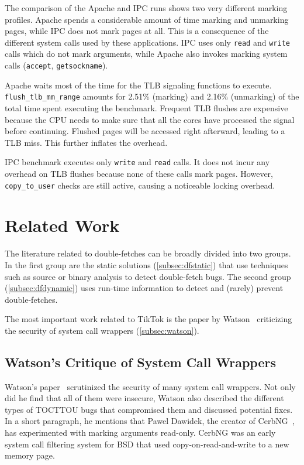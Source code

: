 \documentclass[conference]{IEEEtran}
\newcommand{\sysname}{TikTok}
\begin{document}
The comparison of the Apache and IPC runs shows two very different marking
profiles. Apache spends a considerable amount of time marking and unmarking
pages, while IPC does not mark pages at all. This is a consequence of the
different system calls used by these applications. IPC uses only \texttt{read}
and \texttt{write} calls which do not mark arguments, while Apache also invokes
marking system calls (\texttt{accept}, \texttt{getsockname}).

Apache waits most of the time for the TLB signaling functions to execute.
\texttt{flush\_tlb\_mm\_range} amounts for 2.51\% (marking) and 2.16\%
(unmarking) of the total time spent executing the benchmark. Frequent TLB
flushes are expensive because the CPU needs to make sure that all the cores have
processed the signal before continuing. Flushed pages will be accessed right
afterward, leading to a TLB miss. This further inflates the overhead.

IPC benchmark executes only \texttt{write} and \texttt{read} calls. It does not
incur any overhead on TLB flushes because none of these calls mark pages.
However, \texttt{copy\_to\_user} checks are still active, causing a noticeable
locking overhead.


\section{Related Work}
\label{sec:relatedwork}

The literature related to double-fetches can be broadly divided into two groups.
In the first group are the static solutions (\autoref{subsec:dfstatic}) that use
techniques such as source or binary analysis to detect double-fetch bugs. The
second group (\autoref{subsec:dfdynamic}) uses run-time information to detect
and (rarely) prevent double-fetches.

The most important work related to \sysname{} is the paper by
Watson~\cite{watson2007exploiting} criticizing the security of system call
wrappers (\autoref{subsec:watson}).

\subsection{Watson's Critique of System Call Wrappers}
\label{subsec:watson}
Watson's paper~\cite{watson2007exploiting} scrutinized the security of many
system call wrappers. Not only did he find that all of them were insecure,
Watson also described the different types of TOCTTOU bugs that compromised them
and discussed potential fixes. In a short paragraph, he mentions that Pawel
Dawidek, the creator of CerbNG~\cite{zak_frasunek_dawidek}, has experimented
with marking arguments read-only. CerbNG was an early system call filtering
system for BSD that used copy-on-read-and-write to a new memory page.
\end{document}
